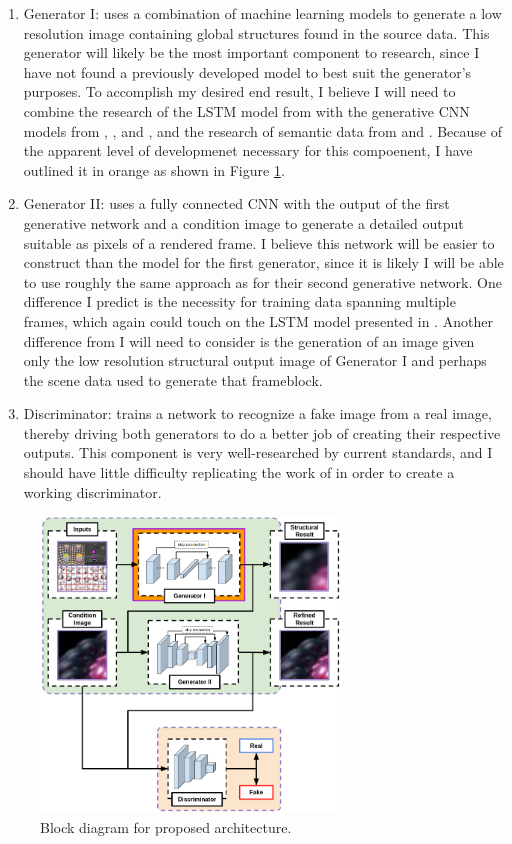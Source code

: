 \documentclass[conference]{IEEEtran}
\begin{document}
\begin{enumerate}
\item Generator I: uses a combination of machine learning models to generate a
low resolution image containing global structures found in the
source data. This generator will likely be the most important component to
research, since I have not found a previously developed model to best suit the
generator's purposes. To accomplish my desired end result,
I believe I will need to combine the research of the LSTM
model from \cite{ref:frame_prediction} with the
generative CNN models from \cite{ref:pixelcnn_decoders}, \cite{ref:pixelcnn++},
and \cite{ref:multi_source}, and the research of semantic data from
\cite{ref:image_captioning} and \cite{ref:posecnn}. Because of the apparent
level of developmenet necessary for this compoenent, I have
outlined it in orange as shown in Figure \ref{fig:block_diagram}.
\item Generator II: uses a fully connected CNN with the output of the first generative network and a
condition image to generate a detailed output suitable as pixels of a rendered
frame. I believe this network will be easier to construct than the model for the
first generator, since it is likely I will be able to use roughly the same approach as
\cite{ref:pose_guided} for their second generative network. One difference I
predict is the necessity for training data spanning multiple frames, which again
could touch on the LSTM model presented in \cite{ref:frame_prediction}.
Another difference from \cite{ref:pose_guided} I will need to consider is the generation of an image given
only the low resolution structural output image of Generator I and perhaps the scene data
used to generate that frameblock.
\item Discriminator: trains a network to recognize a fake image from a real
image, thereby driving both generators to do a better job of creating their
respective outputs. This component is very well-researched by current standards,
and I should have little difficulty replicating the work of
\cite{ref:pose_guided} in order to create a working discriminator.
\end{enumerate}

\begin{figure}[htbp]
\centerline{\includegraphics[width=8cm]{block_diagram.png}}
\caption{Block diagram for proposed architecture.}
\label{fig:block_diagram}
\end{figure}
\end{document}
